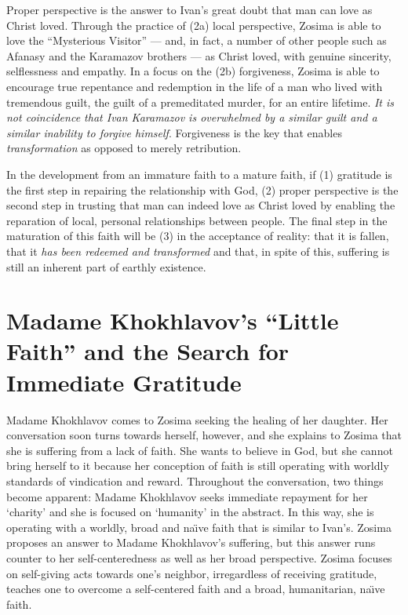	Proper perspective is the answer to Ivan's great doubt that man can love as Christ loved. Through the practice of (2a) local perspective, Zosima is able to love the ``Mysterious Visitor'' --- and, in fact, a number of other people such as Afanasy and the Karamazov brothers --- as Christ loved, with genuine sincerity, selflessness and empathy. In a focus on the (2b) forgiveness, Zosima is able to encourage true repentance and redemption in the life of a man who lived with tremendous guilt, the guilt of a premeditated murder, for an entire lifetime. \emph{It is not coincidence that Ivan Karamazov is overwhelmed by a similar guilt and a similar inability to forgive himself}. Forgiveness is the key that enables \emph{transformation} as opposed to merely retribution. 
	
	In the development from an immature faith to a mature faith, if (1) gratitude is the first step in repairing the relationship with God, (2) proper perspective is the second step in trusting that man can indeed love as Christ loved by enabling the reparation of local, personal relationships between people. The final step in the maturation of this faith will be (3) in the acceptance of reality: that it is fallen, that it \emph{has been redeemed and transformed} and that, in spite of this, suffering is still an inherent part of earthly existence.
	 
\section{Madame Khokhlavov's ``Little Faith'' and the Search for Immediate Gratitude}
Madame Khokhlavov comes to Zosima seeking the healing of her daughter. Her conversation soon turns towards herself, however, and she explains to Zosima that she is suffering from a lack of faith. She wants to believe in God, but she cannot bring herself to it because her conception of faith is still operating with worldly standards of vindication and reward. Throughout the conversation, two things become apparent: Madame Khokhlavov seeks immediate repayment for her `charity' and she is focused on `humanity' in the abstract. In this way, she is operating with a worldly, broad and na\"{\i}ve faith that is similar to Ivan's. Zosima proposes an answer to Madame Khokhlavov's suffering, but this answer runs counter to her self-centeredness as well as her broad perspective. Zosima focuses on self-giving acts towards one's neighbor, irregardless of receiving gratitude, teaches one to overcome a self-centered faith and a broad, humanitarian, na\"{\i}ve faith.

